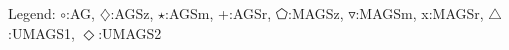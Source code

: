 Legend: {\color{CornflowerBlue}$\circ$}:AG, {\color{Orange}$\diamondsuit$}:AGSz, {\color{Green}$\star$}:AGSm, {\color{red}+}:AGSr, {\color{magenta}$\pentagon$}:MAGSz, {\color{brown}$\triangledown$}:MAGSm, {{}x}:MAGSr, {{}$\triangle$}:UMAGS1, {{}$\Diamond$}:UMAGS2